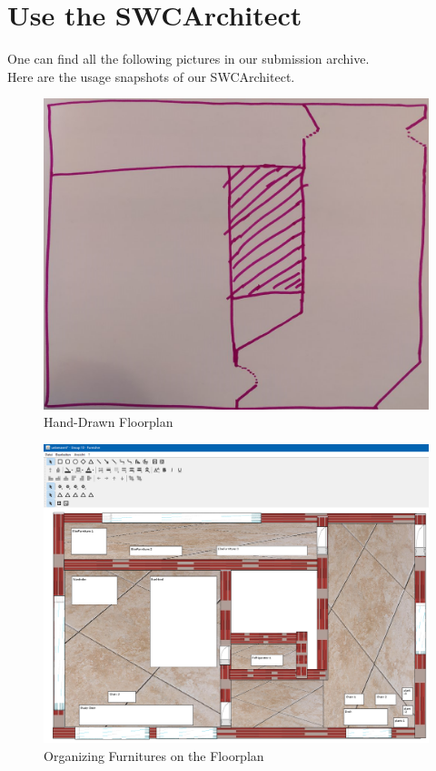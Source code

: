 \clearpage
\section{Use the SWCArchitect}

One can find all the following pictures in our submission archive.\\
Here are the usage snapshots of our SWCArchitect.

\begin{figure}[h]
	\includegraphics[keepaspectratio,width=\textwidth]{images/input.png}
	\caption{Hand-Drawn Floorplan}
\end{figure}

\begin{figure}[h]
	\includegraphics[keepaspectratio,width=\textwidth]{images/program.PNG}
	\caption{Organizing Furnitures on the Floorplan}
\end{figure}

